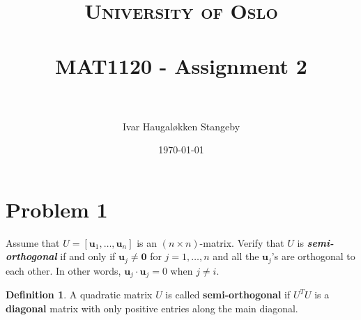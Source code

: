 \documentclass[paper=a4, fontsize=11pt]{scrartcl} %
\title{	
  \normalfont \normalsize
  \textsc{University of Oslo} \\ [25pt] %
  \horrule{0.5pt} \\[0.4cm] %
  \huge MAT1120 - Assignment 2 \\ %
  \horrule{2pt} \\[0.5cm] %
}
\author{Ivar Haugaløkken Stangeby} %
\date{\normalsize\today} %
\numberwithin{equation}{section} %
\numberwithin{figure}{section} %
\numberwithin{table}{section} %
\theoremstyle{definition}
\newtheorem*{definition}{Definition}
\begin{document}
\maketitle %
\section*{Problem 1}
Assume that $U = \left[ \mathbf{u}_1,\dots,\mathbf{u}_n \right]$ is an $\left(n \times n\right)$-matrix.
Verify that $U$ is \textbf{\textit{semi-orthogonal}} if and only if $\mathbf{u}_j \neq \mathbf{0}$ for $j=1,\dots,n$ and all the $\mathbf{u}_j$'s are orthogonal
to each other. In other words, $\mathbf{u}_j \cdot \mathbf{u}_j = 0$ when $j \neq i$.

\begin{definition}
  A quadratic matrix $U$ is called \textbf{semi-orthogonal} if $U^TU$ is a \textbf{diagonal} matrix with only positive entries along the
  main diagonal.
\end{definition}
\end{document}
